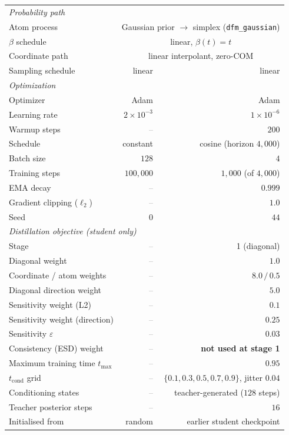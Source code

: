 \documentclass[11pt]{article}
\newcommand{\naa}{\textcolor{gray}{--}}
\begin{document}
\begin{table}[h]
\begin{tabular}{lrr}
\midrule
\multicolumn{3}{l}{\emph{Probability path}} \\
Atom process                   & \multicolumn{2}{c}{Gaussian prior $\to$ simplex (\texttt{dfm\_gaussian})} \\
$\beta$ schedule               & \multicolumn{2}{c}{linear, $\beta(t)=t$} \\
Coordinate path                & \multicolumn{2}{c}{linear interpolant, zero-COM} \\
Sampling schedule              & linear & linear \\
\midrule
\multicolumn{3}{l}{\emph{Optimization}} \\
Optimizer                      & Adam & Adam \\
Learning rate                  & $2\times10^{-3}$ & $1\times10^{-6}$ \\
Warmup steps                   & \naa & $200$ \\
Schedule                       & constant & cosine (horizon $4{,}000$) \\
Batch size                     & $128$ & $4$ \\
Training steps                 & $100{,}000$ & $1{,}000$ (of $4{,}000$) \\
EMA decay                      & \naa & $0.999$ \\
Gradient clipping ($\ell_2$)   & \naa & $1.0$ \\
Seed                           & $0$ & $44$ \\
\midrule
\multicolumn{3}{l}{\emph{Distillation objective (student only)}} \\
Stage                          & \naa & 1 (diagonal) \\
Diagonal weight                & \naa & $1.0$ \\
Coordinate / atom weights      & \naa & $8.0\,/\,0.5$ \\
Diagonal direction weight      & \naa & $5.0$ \\
Sensitivity weight (L2)        & \naa & $0.1$ \\
Sensitivity weight (direction) & \naa & $0.25$ \\
Sensitivity $\varepsilon$      & \naa & $0.03$ \\
Consistency (ESD) weight       & \naa & \textbf{not used at stage 1} \\
Maximum training time $t_{\max}$ & \naa & $0.95$ \\
$t_{\mathrm{cond}}$ grid       & \naa & $\{0.1,0.3,0.5,0.7,0.9\}$, jitter $0.04$ \\
Conditioning states            & \naa & teacher-generated ($128$ steps) \\
Teacher posterior steps        & \naa & $16$ \\
Initialised from               & random & earlier student checkpoint \\
\bottomrule
\end{tabular}
\end{table}
\end{document}
